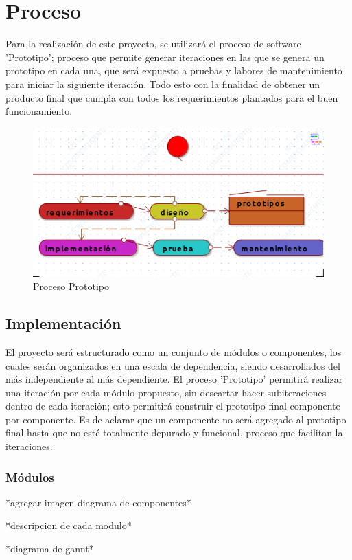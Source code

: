\chapter{Proceso}

Para la realización de este proyecto, se utilizará el proceso de software 'Prototipo'; proceso que permite generar iteraciones en las que se genera un prototipo en cada una, que será expuesto a pruebas y labores de mantenimiento para iniciar la siguiente iteración. Todo esto con la finalidad de obtener un producto final que cumpla con todos los requerimientos plantados para el buen funcionamiento.

\begin{figure}[h!]
	\centering
	\includegraphics[width=0.7\linewidth]{proyecto/proceso/imgs/prototipo}
	\caption{Proceso Prototipo}
\end{figure}
\section{Implementación}

El proyecto será estructurado como un conjunto de módulos o componentes, los cuales serán organizados en una escala de dependencia, siendo desarrollados del más independiente al más dependiente. El proceso 'Prototipo' permitirá realizar una iteración por cada módulo propuesto, sin descartar hacer subiteraciones dentro de cada iteración; esto permitirá construir el prototipo final componente por componente. Es de aclarar que un componente no será agregado al prototipo final hasta que no esté totalmente depurado y funcional, proceso que facilitan la iteraciones.


\subsection{Módulos}

*agregar imagen diagrama de componentes*

*descripcion de cada modulo*

*diagrama de gannt*